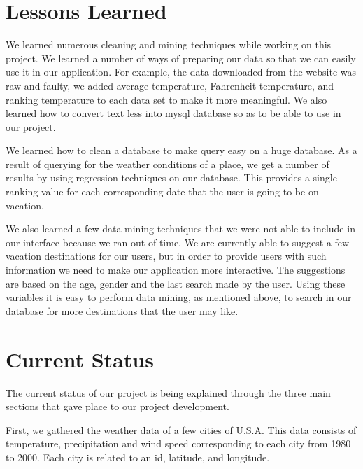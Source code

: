 \documentclass{sig-alternate}
\begin{document}
\section{Lessons Learned}
	\label{Lessons Learned}
	
	We learned numerous cleaning and mining techniques while working on this project. We learned a 			number of ways of preparing our data so that we can easily use it in our application. For example, 		the data downloaded from the website was raw and faulty, we added average temperature, Fahrenheit 		temperature, and ranking temperature to each data set to make it more meaningful. We also learned 		how to convert text less into mysql database so as to be able to use in our project.\newline

	We learned how to clean a database to make query easy on a huge database. As a result of querying 		for the weather conditions of a place, we get a number of results by using regression techniques on 		our database. This provides a single ranking value for each corresponding date that the user is 			going to be on vacation.\newline

	We also learned a few data mining techniques that we were not able to include in our interface 			because we ran out of time. We are currently able to suggest a few vacation destinations for our 			users, but in order to provide users with such information we need to make our application more 			interactive. The suggestions are based on the age, gender and the last search made by the user. 			Using these variables it is easy to perform data mining, as mentioned above, to search in our 			database for more destinations that the user may like.\newline

\section{Current Status}
	\label{current status}
	
	The current status of our project is being explained through the three main sections that gave place 	to our project development.\newline

	First, we gathered the weather data of a few cities of U.S.A. This data consists of temperature, 			precipitation and wind speed corresponding to each city from 1980 to 2000. Each city is related to 		an id, latitude, and longitude. \newline
\end{document}
